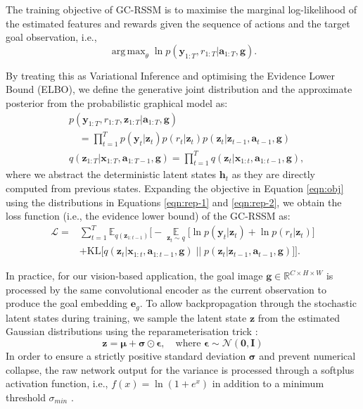 \documentclass[journal]{IEEEtran}
\DeclareMathOperator{\E}{\mathbb{E}}
\DeclareMathOperator*{\argmax}{arg\,max}
\begin{document}
The training objective of GC-RSSM is to maximise the marginal log-likelihood of the estimated features and rewards given the sequence of actions and the target goal observation, i.e.,
\begin{equation}
    \argmax_{\theta} \ln p(\bm{y}_{1:T}, r_{1:T} | \bm{a}_{1:T}, \bm{g}). \label{eqn:obj}
\end{equation}

By treating this as Variational Inference and optimising the Evidence Lower Bound (ELBO), we define the generative joint distribution and the approximate posterior from the probabilistic graphical model as:
\begin{align}
    &p(\bm{y}_{1:T}, r_{1:T}, \bm{z}_{1:T} | \bm{a}_{1:T}, \bm{g}) \nonumber \\
    &\quad = \prod_{t=1}^T p(\bm{y}_t|\bm{z}_t) p(r_t|\bm{z}_t) p(\bm{z}_t|\bm{z}_{t-1}, \bm{a}_{t-1}, \bm{g}) \label{eqn:rep-1}\\
    &q(\bm{z}_{1:T}| \bm{x}_{1:T}, \bm{a}_{1:T-1}, \bm{g}) = \prod_{t=1}^T q(\bm{z}_t| \bm{x}_{1:t}, \bm{a}_{1:t-1}, \bm{g}) \label{eqn:rep-2},
\end{align}
where we abstract the deterministic latent states $\bm{h}_t$ as they are directly computed from previous states. Expanding the objective in Equation \ref{eqn:obj} using the distributions in Equations \ref{eqn:rep-1} and \ref{eqn:rep-2}, we obtain the loss function (i.e., the evidence lower bound) of the GC-RSSM as:
\begin{align}
    \mathcal{L} =& \sum_{t=1}^{T} \mathbb{E}_{q(\bm{z}_{1:t-1})} \Bigg[ - 
     \underset{\bm{z}_t \sim q}{\E} \Big[ \ln p(\bm{y}_t|\bm{z}_t) + \ln p(r_t|\bm{z}_t) \Big] \nonumber\\
    &+ \text{KL}\Big[ q(\bm{z}_t|\bm{x}_{1:t}, \bm{a}_{1:{t-1}}, \bm{g}) \;\Big|\Big|\; p(\bm{z}_{t}|\bm{z}_{t-1}, \bm{a}_{t-1}, \bm{g}) \Big]
     \Bigg] \label{eqn:planet-objective-1}.
\end{align}

In practice, for our vision-based application, the goal image $\bm{g} \in \mathbb{R}^{C\times H\times W}$ is processed by the same convolutional encoder as the current observation to produce the goal embedding $\bm{e}_g$. To allow backpropagation through the stochastic latent states during training, we sample the latent state $\bm{z}$ from the estimated Gaussian distributions using the reparameterisation trick \cite{kingma2013auto}:
\begin{equation}
    \bm{z} = \bm{\mu} + \bm{\sigma} \odot \bm{\epsilon}, \quad \text{where } \bm{\epsilon} \sim \mathcal{N}(\bm{0}, \bm{I}) \label{eqn:reparam}
\end{equation}
In order to ensure a strictly positive standard deviation $\bm{\sigma}$ and prevent numerical collapse, the raw network output for the variance is processed through a softplus activation function, i.e., $f(x)=\ln(1+e^x)$ in addition to a minimum threshold $\sigma_{min}$ \cite{glorot2011deep}.
\end{document}
